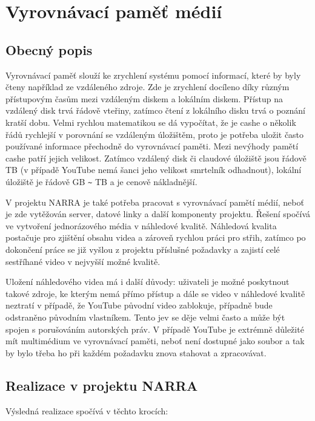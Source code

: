 \section{Vyrovnávací paměť médií}
\subsection{Obecný popis}
\par Vyrovnávací paměť\cite{sap} slouží ke zrychlení systému pomocí  informací, které by byly čteny například ze vzdáleného zdroje. Zde je zrychlení docíleno díky různým přístupovým časům mezi vzdáleným diskem a lokálním diskem. Přístup na vzdálený disk trvá řádově vteřiny, zatímco čtení z lokálního disku trvá o poznání kratší dobu. Velmi rychlou matematikou se dá vypočítat, že je cashe o několik řádů rychlejší v porovnání se vzdáleným úložištěm, proto je potřeba uložit často používané informace přechodně do vyrovnávací paměti. Mezi nevýhody pamětí cashe patří jejich velikost. Zatímco vzdálený disk či claudové úložiště jsou řádově TB (v případě YouTube nemá šanci jeho velikost smrtelník odhadnout), lokální úložiště je řádově GB \verb|~| TB a je cenově nákladnější.
\par V projektu NARRA je také potřeba pracovat s vyrovnávací pamětí médií, neboť je zde vytěžován server, datové linky a další komponenty projektu. Řešení spočívá ve vytvoření jednorázového média v náhledové kvalitě. Náhledová kvalita postačuje pro zjištění obsahu videa a zároveň rychlou práci pro střih, zatímco po dokončení práce se již vyšlou z projektu příslušné požadavky a zajistí celé sestříhané video v nejvyšší možné kvalitě.
\par Uložení náhledového videa má i další důvody: uživateli je možné poskytnout takové zdroje, ke kterým nemá přímo přístup a dále se video v náhledové kvalitě neztratí v případě, že YouTube původní video zablokuje, případně bude odstraněno původním vlastníkem. Tento jev se děje velmi často a může být spojen s porušováním autorských práv. V případě YouTube je extrémně důležité mít multimédium ve vyrovnávací paměti, neboť není dostupné jako soubor a tak by bylo třeba ho při každém požadavku znova stahovat a zpracovávat.

\subsection{Realizace v projektu NARRA}
\par Výsledná realizace spočívá v těchto krocích:

